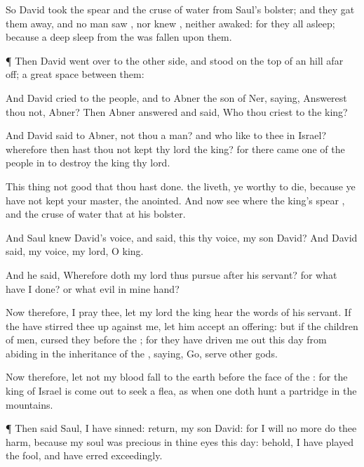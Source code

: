 {So
David
took the
spear and the
cruse of
water from
Saul’s
bolster; and they gat them
away, and no man
saw
{}, nor
knew
{}, neither
awaked: for they
{} all
asleep; because a deep
sleep from the
{} was
fallen upon them.


\par }{\PP {}¶ Then
David went
over to the other
side, and
stood on the
top of an
hill afar
off; a
great
space
{} between them:

And
David
cried to the
people, and to
Abner the
son of
Ner,
saying,
Answerest thou not,
Abner? Then
Abner
answered and
said, Who
{} thou
{}
criest to the
king?

And
David
said to
Abner,
{} not thou a
{}
man? and who
{} like to thee in
Israel? wherefore then hast thou not
kept thy
lord the
king? for there
came
one of the
people in to
destroy the
king thy
lord.

This
thing
{} not
good that thou hast
done.
{} the
{}
liveth, ye
{}
worthy to
die, because ye have not
kept your
master, the
{}
anointed. And now
see where the
king’s
spear
{}, and the
cruse of
water that
{} at his
bolster.

And
Saul
knew
David’s
voice, and
said,
{} this thy
voice, my
son
David? And
David
said,
{} my
voice, my
lord, O
king.

And he
said, Wherefore doth my
lord thus
pursue
after his
servant? for what have I
done? or what
evil
{} in mine
hand?

Now therefore, I pray thee, let my
lord the
king
hear the
words of his
servant. If the
{} have stirred thee
up against me, let him
accept an
offering: but if
{} the
children of
men,
cursed
{} they
before the
{}; for they have
driven me out this
day from
abiding in the
inheritance of the
{},
saying,
Go,
serve
other
gods.

Now therefore, let not my
blood
fall to the
earth before the
face of the
{}: for the
king of
Israel is come
out to
seek
a
flea, as when one doth
hunt a
partridge in the
mountains.


\par }{\PP {}¶ Then
said
Saul, I have
sinned:
return, my
son
David: for I will no more do thee
harm, because my
soul was
precious in thine
eyes this
day: behold, I have played the
fool, and have
erred
exceedingly.

}
